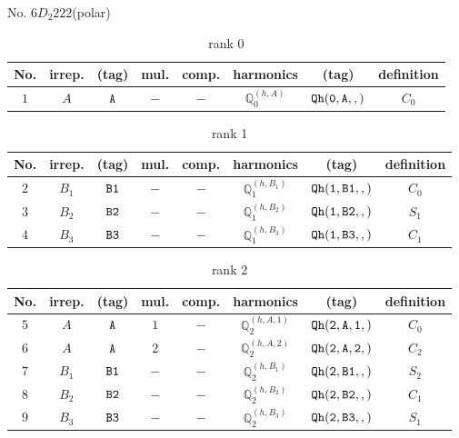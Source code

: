 \documentclass[fleqn,8pt]{jsarticle}
\begin{document}
\setcounter{MaxMatrixCols}{16}

\begin{center}
\LARGE
No. 6\quad$D_{2}$\quad$222$\quad[ orthorhombic ] (polar)
\end{center}
\begin{table}[ht!]
\begin{center}
\caption{rank 0}
\renewcommand{\arraystretch}{1.3}
\begin{tabular}{cccccccc} \hline \hline
No. & irrep. & (tag) & mul. & comp. & harmonics & (tag) & definition \\ \hline
$ 1 $ & $ A $ & $ {\tt A} $ & $ - $ & $ - $ & $ \mathbb{Q}_{0}^{(h,A)} $ & $ {\tt Qh(0,A,,)} $ & $ C_{0} $ \\
 \hline \hline
\end{tabular}
\end{center}
\end{table}
\begin{table}[ht!]
\begin{center}
\caption{rank 1}
\renewcommand{\arraystretch}{1.3}
\begin{tabular}{cccccccc} \hline \hline
No. & irrep. & (tag) & mul. & comp. & harmonics & (tag) & definition \\ \hline
$ 2 $ & $ B_{1} $ & $ {\tt B1} $ & $ - $ & $ - $ & $ \mathbb{Q}_{1}^{(h,B_{1})} $ & $ {\tt Qh(1,B1,,)} $ & $ C_{0} $ \\
$ 3 $ & $ B_{2} $ & $ {\tt B2} $ & $ - $ & $ - $ & $ \mathbb{Q}_{1}^{(h,B_{2})} $ & $ {\tt Qh(1,B2,,)} $ & $ S_{1} $ \\
$ 4 $ & $ B_{3} $ & $ {\tt B3} $ & $ - $ & $ - $ & $ \mathbb{Q}_{1}^{(h,B_{3})} $ & $ {\tt Qh(1,B3,,)} $ & $ C_{1} $ \\
 \hline \hline
\end{tabular}
\end{center}
\end{table}
\begin{table}[ht!]
\begin{center}
\caption{rank 2}
\renewcommand{\arraystretch}{1.3}
\begin{tabular}{cccccccc} \hline \hline
No. & irrep. & (tag) & mul. & comp. & harmonics & (tag) & definition \\ \hline
$ 5 $ & $ A $ & $ {\tt A} $ & $ 1 $ & $ - $ & $ \mathbb{Q}_{2}^{(h,A,1)} $ & $ {\tt Qh(2,A,1,)} $ & $ C_{0} $ \\
$ 6 $ & $ A $ & $ {\tt A} $ & $ 2 $ & $ - $ & $ \mathbb{Q}_{2}^{(h,A,2)} $ & $ {\tt Qh(2,A,2,)} $ & $ C_{2} $ \\
$ 7 $ & $ B_{1} $ & $ {\tt B1} $ & $ - $ & $ - $ & $ \mathbb{Q}_{2}^{(h,B_{1})} $ & $ {\tt Qh(2,B1,,)} $ & $ S_{2} $ \\
$ 8 $ & $ B_{2} $ & $ {\tt B2} $ & $ - $ & $ - $ & $ \mathbb{Q}_{2}^{(h,B_{2})} $ & $ {\tt Qh(2,B2,,)} $ & $ C_{1} $ \\
$ 9 $ & $ B_{3} $ & $ {\tt B3} $ & $ - $ & $ - $ & $ \mathbb{Q}_{2}^{(h,B_{3})} $ & $ {\tt Qh(2,B3,,)} $ & $ S_{1} $ \\
 \hline \hline
\end{tabular}
\end{center}
\end{table}
\end{document}
